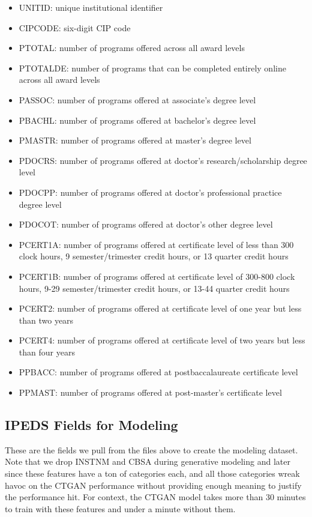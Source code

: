 \documentclass[sigconf, authorversion, nonacm]{acmart}
\begin{document}
        \begin{itemize}
            \item UNITID: unique institutional identifier
            \item CIPCODE: six-digit CIP code
            \item PTOTAL: number of programs offered across all award levels
            \item PTOTALDE: number of programs that can be completed entirely online across all award levels
            \item PASSOC: number of programs offered at associate's degree level
            \item PBACHL: number of programs offered at bachelor's degree level
            \item PMASTR: number of programs offered at master's degree level
            \item PDOCRS: number of programs offered at doctor's research/scholarship degree level
            \item PDOCPP: number of programs offered at doctor's professional practice degree level
            \item PDOCOT: number of programs offered at doctor's other degree level
            \item PCERT1A: number of programs offered at certificate level of less than 300 clock hours, 9 semester/trimester credit hours, or 13 quarter credit hours
            \item PCERT1B: number of programs offered at certificate level of 300-800 clock hours, 9-29 semester/trimester credit hours, or 13-44 quarter credit hours
            \item PCERT2: number of programs offered at certificate level of one year but less than two years
            \item PCERT4: number of programs offered at certificate level of two years but less than four years
            \item PPBACC: number of programs offered at postbaccalaureate certificate level
            \item PPMAST: number of programs offered at post-master's certificate level
        \end{itemize}

    \subsection{IPEDS Fields for Modeling}
        These are the fields we pull from the files above to create the modeling dataset. Note that we drop INSTNM and CBSA during generative modeling and later since these features have a ton of categories each, and all those categories wreak havoc on the CTGAN performance without providing enough meaning to justify the performance hit. For context, the CTGAN model takes more than 30 minutes to train with these features and under a minute without them.
\end{document}
